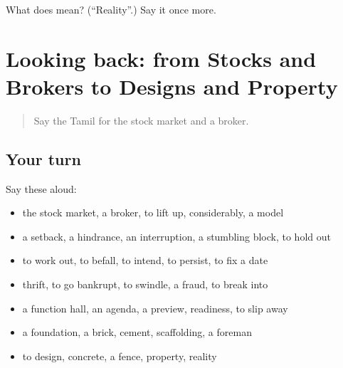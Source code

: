 \begin{tcolorbox}[breakable,colback=teal!4,colframe=teal!35!black,title={Before you move on}]
What does  mean? (\textquotedblleft{}Reality\textquotedblright{}.) Say it once more.
\end{tcolorbox}
\section[(dialogue)]{Looking back: from Stocks and Brokers to Designs and Property}

\label{lesson:TA-R551-review-545-551}



\begin{quote}
Say the Tamil for the stock market and a broker.
\end{quote}

\subsection*{Your turn}
Say these aloud:

\begin{itemize}
\raggedright
  \item the stock market, a broker, to lift up, considerably, a model
  \item a setback, a hindrance, an interruption, a stumbling block, to hold out
  \item to work out, to befall, to intend, to persist, to fix a date
  \item thrift, to go bankrupt, to swindle, a fraud, to break into
  \item a function hall, an agenda, a preview, readiness, to slip away
  \item a foundation, a brick, cement, scaffolding, a foreman
  \item to design, concrete, a fence, property, reality
\end{itemize}

